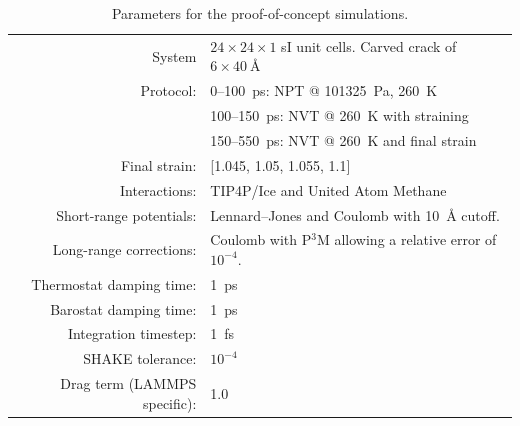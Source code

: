 \begin{table}
\caption{Parameters for the proof-of-concept simulations.}
\label{tbl:proof_of_concept_parameters}
\begin{tabular}{|rl|}
\hline
System & $24\times 24 \times 1$ sI unit cells. Carved crack of $6\times \SI{40}{\angstrom}$\\
Protocol:& 0--\SI{100}{\ps}: NPT @ \SI{101325}{\pascal}, \SI{260}{\kelvin} \\
& 100--\SI{150}{\pico\second}: NVT @ \SI{260}{\kelvin} with straining \\
& 150--\SI{550}{\pico\second}: NVT @ \SI{260}{\kelvin} and final strain \\
Final strain: & [1.045, 1.05, 1.055, 1.1] \\
Interactions: & TIP4P/Ice and United Atom Methane \\
Short-range potentials: & Lennard--Jones and Coulomb with \SI{10}{\angstrom} cutoff. \\
Long-range corrections: & Coulomb with P$^3$M allowing a relative error of $10^{-4}$. \\
Thermostat damping time: & \SI{1}{\pico\second} \\
Barostat damping time: & \SI{1}{\pico\second} \\
Integration timestep: & \SI{1}{\femto\second} \\ 
SHAKE tolerance: & $10^{-4}$ \\
Drag term (LAMMPS specific): & 1.0 \\
\hline
\end{tabular} 
\end{table}


